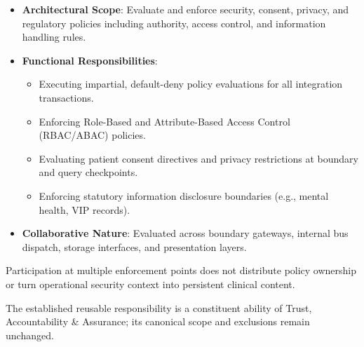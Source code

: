 
\begin{itemize}

\item
\textbf{Architectural Scope}: Evaluate and enforce security, consent, privacy, and regulatory policies including authority, access control, and information handling rules.



\item
\textbf{Functional Responsibilities}:


\begin{itemize}

\item
Executing impartial, default-deny policy evaluations for all integration transactions.



\item
Enforcing Role-Based and Attribute-Based Access Control (RBAC/\allowbreak{}ABAC) policies.



\item
Evaluating patient consent directives and privacy restrictions at boundary and query checkpoints.



\item
Enforcing statutory information disclosure boundaries (e.g., mental health, VIP records).



\end{itemize}


\item
\textbf{Collaborative Nature}: Evaluated across boundary gateways, internal bus dispatch, storage interfaces, and presentation layers.



\end{itemize}


Participation at multiple enforcement points does not distribute policy ownership or turn operational security context into persistent clinical content.



The established reusable responsibility is a constituent ability of Trust, Accountability \& Assurance; its canonical scope and exclusions remain unchanged.


